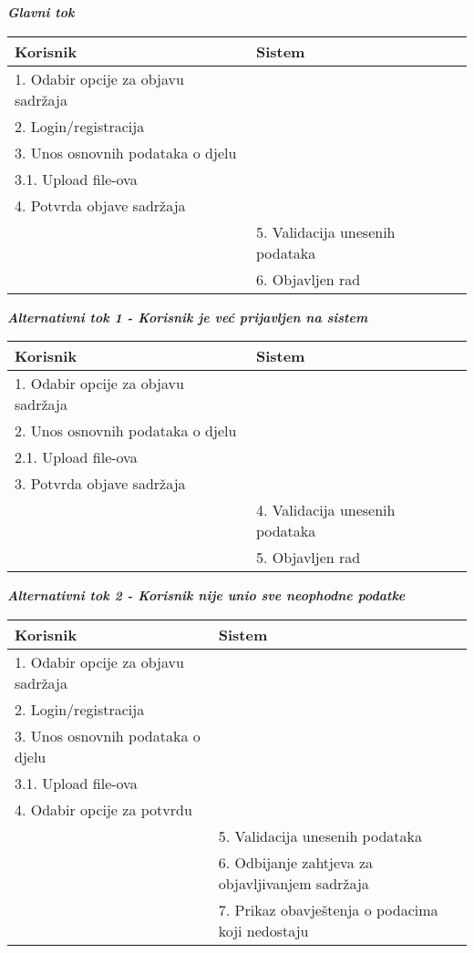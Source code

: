 \documentclass[12pt, a4paper]{report}
\begin{document}
\begin{flushleft}
\textbf{\textit{Glavni tok}}
\begin{tabular}{|m{7cm}|m{7cm}|}
\hline
\textbf{Korisnik} & \textbf{Sistem} \\
\hline
1. Odabir opcije za objavu sadržaja &  \\
\hline
2. Login/registracija &  \\
\hline
3. Unos osnovnih podataka o djelu &  \\
\hline
3.1. Upload file-ova &  \\
\hline
4. Potvrda objave sadržaja &  \\
\hline
 & 5. Validacija unesenih podataka \\
\hline
 & 6. Objavljen rad \\
\hline
\end{tabular} \newline \newline

\textbf{\textit{Alternativni tok 1 - Korisnik je već prijavljen na sistem}} \\
\begin{tabular}{|m{7cm}|m{7cm}|}
\hline
\textbf{Korisnik} & \textbf{Sistem} \\
\hline
1. Odabir opcije za objavu sadržaja &  \\
\hline
2. Unos osnovnih podataka o djelu &  \\
\hline
2.1. Upload file-ova &  \\
\hline
3. Potvrda objave sadržaja &  \\
\hline
 & 4. Validacija unesenih podataka \\
\hline
 & 5. Objavljen rad \\
\hline
\end{tabular} \newline \newline

{\textbf{\textit{Alternativni tok 2 - Korisnik nije unio sve neophodne podatke}}}

\begin{tabular}{|m{7cm}|m{7cm}|}
\hline
\textbf{Korisnik} & \textbf{Sistem} \\
\hline
1. Odabir opcije za objavu sadržaja &  \\
\hline
2. Login/registracija &  \\
\hline
3. Unos osnovnih podataka o djelu &  \\
\hline
3.1. Upload file-ova &  \\
\hline
4. Odabir opcije za potvrdu &  \\
\hline
 & 5. Validacija unesenih podataka \\
\hline
 & 6. Odbijanje zahtjeva za objavljivanjem sadržaja \\
\hline
 & 7. Prikaz obavještenja o podacima koji nedostaju \\
 \hline
\end{tabular} \newpage


\end{flushleft}
\end{document}
